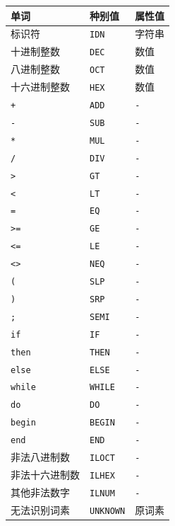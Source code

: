\documentclass[
  a4paper,
  fontset=none,
]{ctexart}
\begin{document}
\begin{longtable}[]{@{}lll@{}}
\toprule\noalign{}
单词 & 种别值 & 属性值 \\
\midrule\noalign{}
\endhead
\bottomrule\noalign{}
\endlastfoot
标识符 & \texttt{IDN} & 字符串 \\
十进制整数 & \texttt{DEC} & 数值 \\
八进制整数 & \texttt{OCT} & 数值 \\
十六进制整数 & \texttt{HEX} & 数值 \\
\texttt{+} & \texttt{ADD} & \texttt{-} \\
\texttt{-} & \texttt{SUB} & \texttt{-} \\
\texttt{*} & \texttt{MUL} & \texttt{-} \\
\texttt{/} & \texttt{DIV} & \texttt{-} \\
\texttt{\textgreater{}} & \texttt{GT} & \texttt{-} \\
\texttt{\textless{}} & \texttt{LT} & \texttt{-} \\
\texttt{=} & \texttt{EQ} & \texttt{-} \\
\texttt{\textgreater{}=} & \texttt{GE} & \texttt{-} \\
\texttt{\textless{}=} & \texttt{LE} & \texttt{-} \\
\texttt{\textless{}\textgreater{}} & \texttt{NEQ} & \texttt{-} \\
\texttt{(} & \texttt{SLP} & \texttt{-} \\
\texttt{)} & \texttt{SRP} & \texttt{-} \\
\texttt{;} & \texttt{SEMI} & \texttt{-} \\
\texttt{if} & \texttt{IF} & \texttt{-} \\
\texttt{then} & \texttt{THEN} & \texttt{-} \\
\texttt{else} & \texttt{ELSE} & \texttt{-} \\
\texttt{while} & \texttt{WHILE} & \texttt{-} \\
\texttt{do} & \texttt{DO} & \texttt{-} \\
\texttt{begin} & \texttt{BEGIN} & \texttt{-} \\
\texttt{end} & \texttt{END} & \texttt{-} \\
非法八进制数 & \texttt{ILOCT} & \texttt{-} \\
非法十六进制数 & \texttt{ILHEX} & \texttt{-} \\
其他非法数字 & \texttt{ILNUM} & \texttt{-} \\
无法识别词素 & \texttt{UNKNOWN} & 原词素 \\
\end{longtable}
\end{document}
